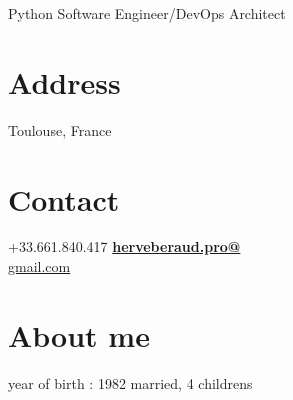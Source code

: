 \documentclass[]{friggeri-cv}
\begin{document}
    {Python Software Engineer/DevOps Architect}


\begin{aside}
    \section{Address}
        Toulouse, France
        ~
    \section{Contact}
        +33.661.840.417
        \href{mailto:herveberaud.pro@gmail.com}{\textbf{herveberaud.pro@}\\gmail.com}
        ~
    \section{About me}
        year of birth : 1982
        married, 4 childrens 
        ~

\end{aside}
\end{document}
